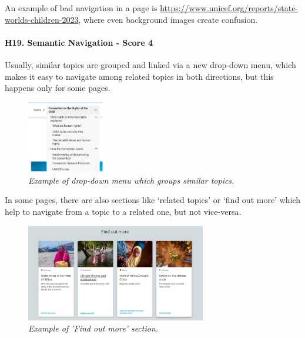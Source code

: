\newline An example of bad navigation in a page is \href{https://www.unicef.org/reports/state-worlds-children-2023}{https://www.unicef.org/reports/state-worlds-children-2023}, where even background images create confusion.
\newline
\newline \paragraph{H19. Semantic Navigation - Score 4}  \label{subsec:H19}	Usually, similar topics are grouped and linked via a new drop-down menu, which makes it easy to navigate among related topics in both directions, but this happens only for some pages.
\begin{figure}[!h]
	\begin{center}
		\includegraphics[width=0.3\textwidth]{FinalScores21.jpg}
		\captionsetup{font=small}
		\caption{\textit{Example of drop-down menu which groups similar topics.}}
	\end{center}
\end{figure}
\newline In some pages, there are also sections like ‘related topics’ or ‘find out more’ which help to navigate from a topic to a related one, but not vice-versa.
\begin{figure}[!h]
	\begin{center}
		\includegraphics[width=0.7\textwidth]{FinalScores22.jpg}
		\captionsetup{font=small}
		\caption{\textit{Example of 'Find out more' section.}}
	\end{center}
\end{figure}
